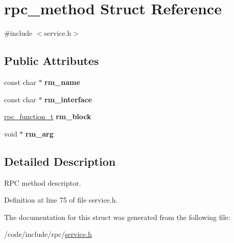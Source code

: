 \hypertarget{structrpc__method}{}\section{rpc\+\_\+method Struct Reference}
\label{structrpc__method}


{\ttfamily \#include $<$service.\+h$>$}

\subsection*{Public Attributes}
\begin{DoxyCompactItemize}
\item 
const char $\ast$ {\bfseries rm\+\_\+name}\hypertarget{structrpc__method_abeff7db58d8903e9e6827d4acac7a8a0}{}\label{structrpc__method_abeff7db58d8903e9e6827d4acac7a8a0}

\item 
const char $\ast$ {\bfseries rm\+\_\+interface}\hypertarget{structrpc__method_ad16d04d88d239e7412260ba948d88f7e}{}\label{structrpc__method_ad16d04d88d239e7412260ba948d88f7e}

\item 
\hyperlink{service_8h_a02d3dbd723de9bd5140887c9935ff05a}{rpc\+\_\+function\+\_\+t} {\bfseries rm\+\_\+block}\hypertarget{structrpc__method_ad6f2db7ebb8d4747730d4cb25b0c6824}{}\label{structrpc__method_ad6f2db7ebb8d4747730d4cb25b0c6824}

\item 
void $\ast$ {\bfseries rm\+\_\+arg}\hypertarget{structrpc__method_afc4708084618f0879e54efda3292cf8c}{}\label{structrpc__method_afc4708084618f0879e54efda3292cf8c}

\end{DoxyCompactItemize}


\subsection{Detailed Description}
R\+PC method descriptor. 

Definition at line 75 of file service.\+h.



The documentation for this struct was generated from the following file\+:\begin{DoxyCompactItemize}
\item 
/code/include/rpc/\hyperlink{service_8h}{service.\+h}\end{DoxyCompactItemize}
